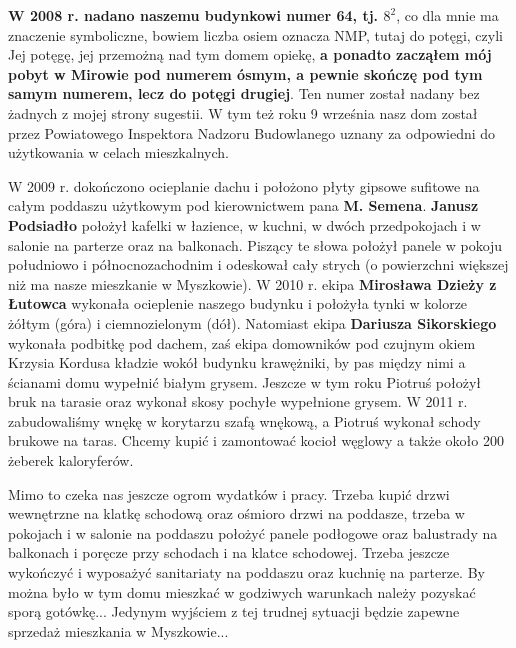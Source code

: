 \textbf{W 2008 r. nadano naszemu budynkowi numer 64, tj. $8^{2}$}, co dla mnie ma znaczenie symboliczne, bowiem liczba osiem oznacza NMP, tutaj do potęgi, czyli Jej potęgę, jej przemożną nad tym domem opiekę, \textbf{a ponadto zacząłem mój pobyt w Mirowie pod numerem ósmym, a pewnie skończę pod tym samym numerem, lecz do potęgi drugiej}. Ten numer został nadany bez żadnych z mojej strony sugestii. W tym też roku 9 września nasz dom został przez Powiatowego Inspektora Nadzoru Budowlanego uznany za odpowiedni do użytkowania w celach mieszkalnych.

W 2009 r. dokończono ocieplanie dachu  i położono płyty gipsowe sufitowe na całym poddaszu użytkowym pod kierownictwem pana \textbf{M. Semena}. \textbf{Janusz Podsiadło} położył kafelki w łazience, w kuchni, w dwóch przedpokojach i w salonie na parterze oraz na balkonach. Piszący te słowa  położył panele w pokoju południowo i północnozachodnim i odeskował cały strych (o powierzchni większej niż ma nasze mieszkanie w Myszkowie). W 2010 r. ekipa \textbf{Mirosława Dzieży z Łutowca} wykonała ocieplenie naszego budynku i położyła tynki w kolorze żółtym (góra) i ciemnozielonym (dół). Natomiast ekipa \textbf{Dariusza Sikorskiego} wykonała podbitkę pod dachem, zaś ekipa domowników pod czujnym okiem Krzysia Kordusa kładzie wokół budynku krawężniki, by pas między nimi a ścianami domu wypełnić białym grysem. Jeszcze w tym roku Piotruś położył bruk na tarasie oraz wykonał skosy pochyłe wypełnione grysem. W 2011 r. zabudowaliśmy wnękę w korytarzu szafą wnękową, a Piotruś wykonał schody brukowe na taras. Chcemy kupić i zamontować kocioł węglowy a także około 200 żeberek kaloryferów.

Mimo to czeka nas jeszcze ogrom wydatków i pracy. Trzeba kupić drzwi wewnętrzne na klatkę schodową oraz ośmioro drzwi na poddasze, trzeba w pokojach i w salonie na poddaszu położyć panele podłogowe oraz balustrady na balkonach i poręcze przy schodach i na klatce schodowej. Trzeba jeszcze wykończyć i wyposażyć sanitariaty na poddaszu oraz kuchnię na parterze. By można było w tym domu mieszkać w godziwych warunkach należy pozyskać sporą gotówkę... Jedynym wyjściem z tej trudnej sytuacji będzie zapewne sprzedaż mieszkania w Myszkowie...

